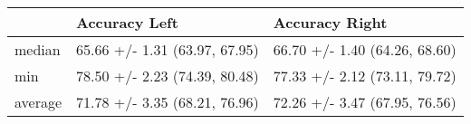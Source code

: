 \begin{tabular}{lll}
\toprule
{} &                  Accuracy Left &                 Accuracy Right \\
\midrule
median  &  65.66 +/- 1.31 (63.97, 67.95) &  66.70 +/- 1.40 (64.26, 68.60) \\
min     &  78.50 +/- 2.23 (74.39, 80.48) &  77.33 +/- 2.12 (73.11, 79.72) \\
average &  71.78 +/- 3.35 (68.21, 76.96) &  72.26 +/- 3.47 (67.95, 76.56) \\
\bottomrule
\end{tabular}
